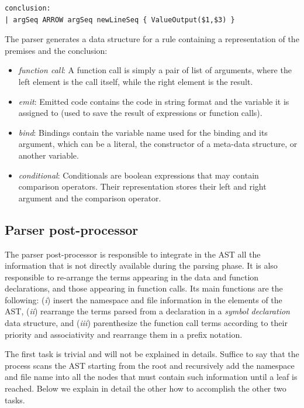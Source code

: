 \begin{lstlisting}
conclusion:
| argSeq ARROW argSeq newLineSeq { ValueOutput($1,$3) }
\end{lstlisting}

The parser generates a data structure for a rule containing a representation of the premises and the conclusion:

\begin{itemize}[noitemsep]
\item \textit{function call}: A function call is simply a pair of list of arguments, where the left element is the call itself, while the right element is the result.

\item \textit{emit}: Emitted code contains the code in string format and the variable it is assigned to (used to save the result of expressions or function calls).

\item \textit{bind}: Bindings contain the variable name used for the binding and its argument, which can be a literal, the constructor of a meta-data structure, or another variable.

\item \textit{conditional}: Conditionals are boolean expressions that may contain comparison operators. Their representation stores their left and right argument and the comparison operator.
\end{itemize}

\subsection{Parser post-processor}
\label{sec:ch_metacasanova_parser_post-processor}
The parser post-processor is responsible to integrate in the AST all the information that is not directly available during the parsing phase. It is also responsible to re-arrange the terms appearing in the data and function declarations, and those appearing in function calls. Its main functions are the following: (\textit{i}) insert the namespace and file information in the elements of the AST, (\textit{ii}) rearrange the terms parsed from a declaration in a \textit{symbol declaration} data structure, and (\textit{iii}) parenthesize the function call terms according to their priority and associativity and rearrange them in a prefix notation.

The first task is trivial and will not be explained in details. Suffice to say that the process scans the AST starting from the root and recursively add the namespace and file name into all the nodes that must contain such information until a leaf is reached. Below we explain in detail the other how to accomplish the other two tasks.

